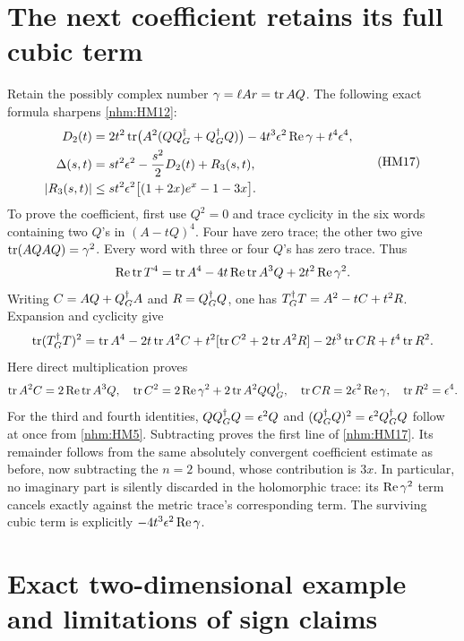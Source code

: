 \section{The next coefficient retains its full cubic term}

Retain the possibly complex number \(\gamma=\ell Ar=\operatorname{tr} AQ\).
The following exact formula sharpens \eqref{nhm:HM12}:
\begin{equation}
 \begin{split}
 D_2(t)={}&2t^2\operatorname{tr}\bigl(A^2(QQ^\dagger_G+Q^\dagger_G Q)\bigr)
       -4t^3\epsilon^2\operatorname{Re}\gamma+t^4\epsilon^4,\\
 \Delta(s,t)={}&s t^2\epsilon^2-\frac{s^2}{2}D_2(t)+R_3(s,t),\\
 |R_3(s,t)|\le{}&s t^2\epsilon^2
       \bigl[(1+2x)e^x-1-3x\bigr].
 \end{split}
 \tag{HM17}\label{nhm:HM17}
\end{equation}
To prove the coefficient, first use \(Q^2=0\) and trace cyclicity in the
six words containing two \(Q\)'s in \((A-tQ)^4\). Four have zero trace;
the other two give \(\operatorname{tr}(AQAQ)=\gamma^2\). Every word with three or four
\(Q\)'s has zero trace. Thus
\[
 \operatorname{Re}\operatorname{tr} T^4=\operatorname{tr} A^4-4t\operatorname{Re}\operatorname{tr} A^3Q+2t^2\operatorname{Re}\gamma^2.
\]
Writing \(C=AQ+Q^\dagger_G A\) and \(R=Q^\dagger_G Q\), one has
\(T^\dagger_G T=A^2-tC+t^2R\). Expansion and cyclicity give
\[
 \operatorname{tr}(T^\dagger_G T)^2=\operatorname{tr} A^4-2t\operatorname{tr} A^2C
  +t^2[\operatorname{tr} C^2+2\operatorname{tr} A^2R]-2t^3\operatorname{tr} CR+t^4\operatorname{tr} R^2.
\]
Here direct multiplication proves
\[
 \operatorname{tr} A^2C=2\operatorname{Re}\operatorname{tr} A^3Q,\quad
 \operatorname{tr} C^2=2\operatorname{Re}\gamma^2+2\operatorname{tr} A^2QQ^\dagger_G,
 \quad \operatorname{tr} CR=2\epsilon^2\operatorname{Re}\gamma,\quad \operatorname{tr} R^2=\epsilon^4.
\]
For the third and fourth identities, \(QQ^\dagger_G Q=\epsilon^2Q\) and
\((Q^\dagger_G Q)^2=\epsilon^2Q^\dagger_G Q\) follow at once from \eqref{nhm:HM5}.
Subtracting proves the first line of \eqref{nhm:HM17}. Its remainder follows
from the same absolutely convergent coefficient estimate as before, now
subtracting the \(n=2\) bound, whose contribution is \(3x\).
In particular, no imaginary part is silently discarded in the holomorphic
trace: its \(\operatorname{Re}\gamma^2\) term cancels exactly against the metric trace's
corresponding term. The surviving cubic term is explicitly
\(-4t^3\epsilon^2\operatorname{Re}\gamma\).

\section{Exact two-dimensional example and limitations of sign claims}


